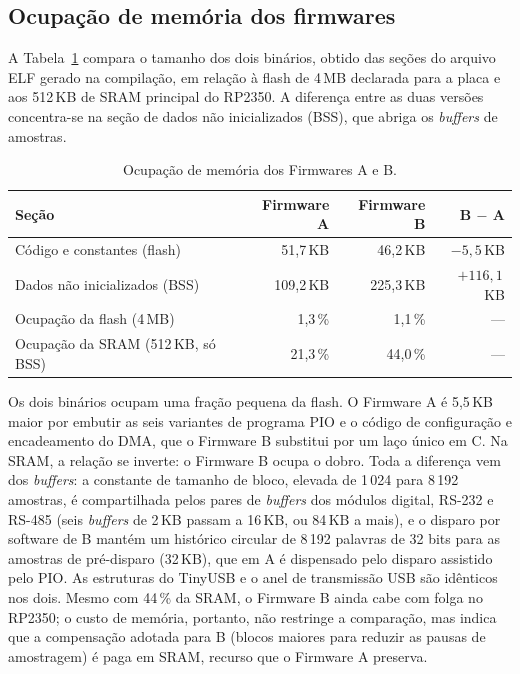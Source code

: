 \subsection{Ocupação de memória dos firmwares}\label{sec:fw-memoria}

A Tabela~\ref{tab:fw-memoria} compara o tamanho dos dois binários, obtido das
seções do arquivo \ac{ELF} gerado na compilação, em relação à flash de 4\,MB
declarada para a placa e aos 512\,KB de \ac{SRAM} principal do RP2350. A
diferença entre as duas versões concentra-se na seção de dados não
inicializados (\ac{BSS}), que abriga os \emph{buffers} de amostras.

\begin{table}[H]
  \centering
  \caption{Ocupação de memória dos Firmwares A e B.}
  \label{tab:fw-memoria}
  \begin{tabular}{@{}lrrr@{}}
    \toprule
    \textbf{Seção}                 & \textbf{Firmware A} & \textbf{Firmware B} & \textbf{B $-$ A} \\
    \midrule
    Código e constantes (flash)    & 51,7\,KB            & 46,2\,KB            & $-5{,}5$\,KB     \\
    Dados não inicializados (\acs{BSS})  & 109,2\,KB           & 225,3\,KB           & $+116{,}1$\,KB   \\
    \midrule
    Ocupação da flash (4\,MB)      & 1,3\,\%             & 1,1\,\%             & ---              \\
    Ocupação da \acs{SRAM} (512\,KB, só \acs{BSS})     & 21,3\,\%            & 44,0\,\%            & ---              \\
    \bottomrule
  \end{tabular}
\end{table}

Os dois binários ocupam uma fração pequena da flash. O Firmware A é 5,5\,KB
maior por embutir as seis variantes de programa \ac{PIO} e o código de configuração
e encadeamento do \ac{DMA}, que o Firmware B substitui por um laço único em C. Na
\ac{SRAM}, a relação se inverte: o Firmware B ocupa o dobro. Toda a diferença vem
dos \emph{buffers}: a constante de tamanho de bloco, elevada de 1\,024 para
8\,192 amostras, é compartilhada pelos pares de \emph{buffers} dos módulos
digital, RS-232 e RS-485 (seis \emph{buffers} de 2\,KB passam a 16\,KB, ou
84\,KB a mais), e o disparo por software de B mantém um histórico circular de
8\,192 palavras de 32 bits para as amostras de pré-disparo (32\,KB), que em A
é dispensado pelo disparo assistido pelo \ac{PIO}. As estruturas do TinyUSB e o
anel de transmissão \ac{USB} são idênticos nos dois. Mesmo com 44\,\% da \ac{SRAM}, o
Firmware B ainda cabe com folga no RP2350; o custo de memória, portanto, não
restringe a comparação, mas indica que a compensação adotada para B (blocos
maiores para reduzir as pausas de amostragem) é paga em \ac{SRAM}, recurso que o
Firmware A preserva.

